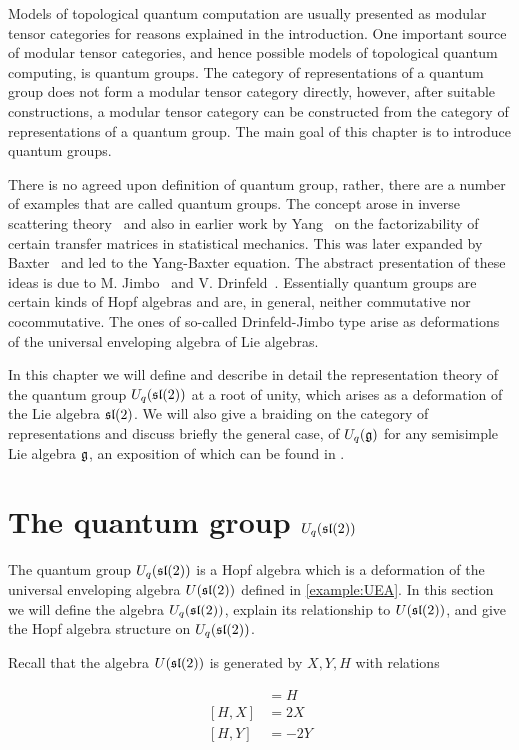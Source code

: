 Models of topological quantum computation are usually presented as modular
tensor categories for reasons explained in the introduction.  One important
source
of modular tensor categories, and hence possible models of topological quantum
computing, is quantum groups.  The category of representations of a quantum
group does not form a modular tensor category directly, however, after suitable
constructions, a modular tensor category can be constructed from the category
of representations of a quantum group.  The main goal of this chapter is to
introduce quantum groups.

There is no agreed upon definition of quantum group, rather, there are a
number of examples that are called quantum groups.  The concept arose in
inverse scattering theory~\cite{Faddeev79} and also in earlier work by
Yang~\cite{Yang67} on the factorizability of certain transfer matrices in
statistical mechanics.  This was later expanded by Baxter~\cite{Baxter82}
and led to the Yang-Baxter equation.  The abstract presentation of these
ideas is due to M. Jimbo~\cite{Jimbo85} and V. Drinfeld~\cite{Drinfeld86}.
Essentially quantum groups are certain kinds of Hopf algebras and are, in
general, neither commutative nor cocommutative.  The ones of so-called
Drinfeld-Jimbo type arise as deformations of the universal enveloping
algebra of Lie algebras.

In this chapter we will define and describe in detail the representation theory
of the quantum group $U_q(\mathfrak{sl}(2))$ at a root of unity, which arises as a
deformation of the Lie algebra $\mathfrak{sl}(2)$. We will also give a braiding on the
category of representations and discuss briefly the general case, of
$U_q(\mathfrak{g})$ for any semisimple Lie algebra $\mathfrak{g}$, an exposition of which
can be found in \cite{CP}.

\section{The quantum group $U_q(\mathfrak{sl}(2))$}
\label{UqSL2}


The quantum group $U_q(\mathfrak{sl}(2))$ is a Hopf algebra which is a deformation of the
universal enveloping algebra $U(\mathfrak{sl}(2))$ defined in \ref{example:UEA}.  In this
section we will define the algebra $U_q(\mathfrak{sl}(2))$, explain its relationship to 
$U(\mathfrak{sl}(2))$, and give the Hopf algebra structure on $U_q(\mathfrak{sl}(2))$.

Recall that the algebra $U(\mathfrak{sl}(2))$ is generated by $X,Y,H$ with relations

\begin{align}
[X,Y] & = H \\ 
[H,X] &= 2X \\
[H,Y] &= -2Y \\
\end{align}

